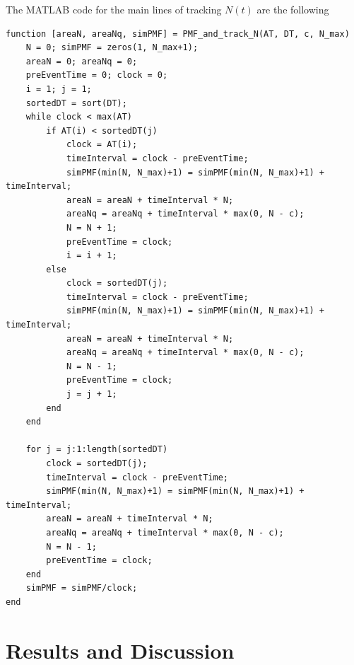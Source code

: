 \documentclass[12pt, a4paper]{article}
\begin{document}
The MATLAB code for the main lines of tracking $N(t)$ are the following 
\begin{lstlisting}[style=Matlab-editor, basicstyle=\ttfamily\footnotesize]
  function [areaN, areaNq, simPMF] = PMF_and_track_N(AT, DT, c, N_max)
    N = 0; simPMF = zeros(1, N_max+1);
    areaN = 0; areaNq = 0;
    preEventTime = 0; clock = 0;
    i = 1; j = 1;
    sortedDT = sort(DT);
    while clock < max(AT)
        if AT(i) < sortedDT(j)
            clock = AT(i);
            timeInterval = clock - preEventTime;
            simPMF(min(N, N_max)+1) = simPMF(min(N, N_max)+1) + timeInterval;
            areaN = areaN + timeInterval * N;
            areaNq = areaNq + timeInterval * max(0, N - c);
            N = N + 1;
            preEventTime = clock;
            i = i + 1;
        else
            clock = sortedDT(j);
            timeInterval = clock - preEventTime;
            simPMF(min(N, N_max)+1) = simPMF(min(N, N_max)+1) + timeInterval;
            areaN = areaN + timeInterval * N;
            areaNq = areaNq + timeInterval * max(0, N - c);
            N = N - 1;
            preEventTime = clock;
            j = j + 1;
        end
    end

    for j = j:1:length(sortedDT)
        clock = sortedDT(j);
        timeInterval = clock - preEventTime;
        simPMF(min(N, N_max)+1) = simPMF(min(N, N_max)+1) + timeInterval;
        areaN = areaN + timeInterval * N;
        areaNq = areaNq + timeInterval * max(0, N - c);
        N = N - 1;
        preEventTime = clock;
    end 
    simPMF = simPMF/clock;
end
\end{lstlisting}




\newpage
\section{Results and Discussion}
\end{document}
